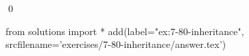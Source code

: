 
\begin{ex}
  \label{ex:7-80-inheritance}
  
  \qed
\end{ex}
\begin{python0}
from solutions import *
add(label="ex:7-80-inheritance",
    srcfilename='exercises/7-80-inheritance/answer.tex')
\end{python0}
